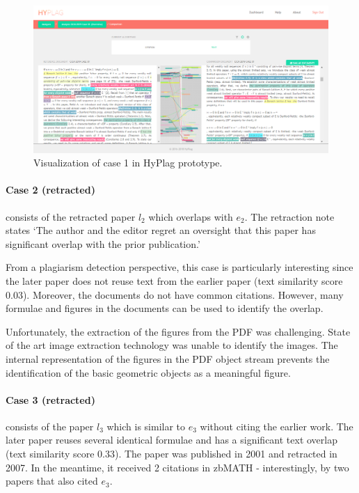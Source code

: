 \documentclass{llncs}
\begin{document}
\begin{figure}[tb]
\noindent\includegraphics[width=\textwidth]{case1.png}
\caption{Visualization of case 1 in HyPlag prototype.}\label{fg.case1}
\end{figure}

\paragraph{Case 2 (retracted)} consists of the retracted paper $l_2$ which overlaps with $e_2$. The retraction note states `The author and the editor regret an oversight that this paper has significant overlap with the prior publication.'

From a plagiarism detection perspective, this case is particularly interesting since the later paper does not reuse text from the earlier paper (text similarity score 0.03). Moreover, the documents do not have common citations. However, many formulae and figures in the documents can be used to identify the overlap.

Unfortunately, the extraction of the figures from the PDF was challenging. State of the art image extraction technology was unable to identify the images. The internal representation of the figures in the PDF object stream prevents the identification of the basic geometric objects as a meaningful figure.

\paragraph{Case 3 (retracted)} consists of the paper $l_3$ which is similar to $e_3$ without citing the earlier work. The later paper reuses several identical formulae and has a significant text overlap (text similarity score 0.33). The paper was published in 2001 and retracted in 2007. In the meantime, it received 2 citations in zbMATH - interestingly, by two papers that also cited $e_3$.
\end{document}
